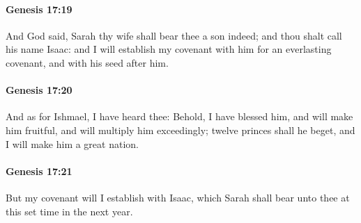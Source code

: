 		\paragraph{Genesis 17:19} %
			\label{GENESIS-17-19}

			And God said, Sarah thy wife shall bear thee a son indeed; and thou shalt call his name Isaac: and I will establish my covenant with him for an everlasting covenant, and with his seed after him.


		\paragraph{Genesis 17:20} %
			\label{GENESIS-17-20}

			And as for Ishmael, I have heard thee: Behold, I have blessed him, and will make him fruitful, and will multiply him exceedingly; twelve princes shall he beget, and I will make him a great nation.


		\paragraph{Genesis 17:21} %
			\label{GENESIS-17-21}

			But my covenant will I establish with Isaac, which Sarah shall bear unto thee at this set time in the next year.


